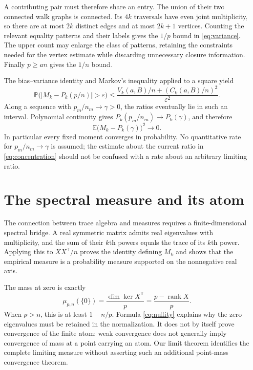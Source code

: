 \documentclass[11pt]{article}
\theoremstyle{remark}
\newcommand{\E}{\mathbb E}
\newcommand{\Prob}{\mathbb P}
\begin{document}
A contributing pair must therefore share an entry. The union of their two connected walk graphs is connected. Its $4k$ traversals have even joint multiplicity, so there are at most $2k$ distinct edges and at most $2k+1$ vertices. Counting the relevant equality patterns and their labels gives the $1/p$ bound in \eqref{eq:variance}. The upper count may enlarge the class of patterns, retaining the constraints needed for the vertex estimate while discarding unnecessary closure information. Finally $p\geq an$ gives the $1/n$ bound.

The bias--variance identity and Markov's inequality applied to a square yield
\begin{equation}\label{eq:concentration}
 \Prob\bigl(|M_k-P_k(p/n)|>\varepsilon\bigr)
 \leq\frac{V_k(a,B)/n+(C_k(a,B)/n)^2}{\varepsilon^2}.
\end{equation}
Along a sequence with $p_m/n_m\to\gamma>0$, the ratios eventually lie in such an interval. Polynomial continuity gives $P_k(p_m/n_m)\to P_k(\gamma)$, and therefore
\begin{equation}\label{eq:moment-convergence}
 \E\bigl(M_k-P_k(\gamma)\bigr)^2\longrightarrow0.
\end{equation}
In particular every fixed moment converges in probability. No quantitative rate for $p_m/n_m\to\gamma$ is assumed; the estimate about the current ratio in \eqref{eq:concentration} should not be confused with a rate about an arbitrary limiting ratio.

\section{The spectral measure and its atom}
The connection between trace algebra and measures requires a finite-dimensional spectral bridge. A real symmetric matrix admits real eigenvalues with multiplicity, and the sum of their $k$th powers equals the trace of its $k$th power. Applying this to $XX^{\mathsf T}/n$ proves the identity defining $M_k$ and shows that the empirical measure is a probability measure supported on the nonnegative real axis.

The mass at zero is exactly
\begin{equation}\label{eq:nullity}
 \mu_{p,n}(\{0\})=\frac{\dim\ker X^{\mathsf T}}p
 =\frac{p-\operatorname{rank}X}{p}.
\end{equation}
When $p>n$, this is at least $1-n/p$. Formula \eqref{eq:nullity} explains why the zero eigenvalues must be retained in the normalization. It does not by itself prove convergence of the finite atom: weak convergence does not generally imply convergence of mass at a point carrying an atom. Our limit theorem identifies the complete limiting measure without asserting such an additional point-mass convergence theorem.
\end{document}
